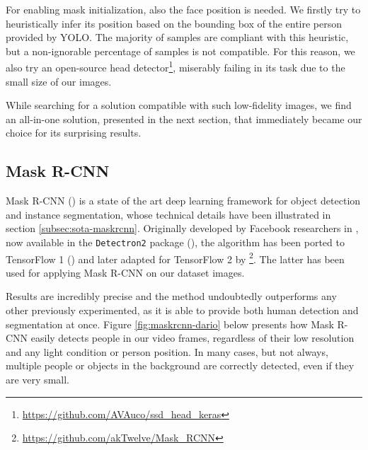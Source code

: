 \medskip

For enabling mask initialization, also the face position is needed. We firstly try to heuristically infer its position based on the bounding box of the entire person provided by YOLO. The majority of samples are compliant with this heuristic, but a non-ignorable percentage of samples is not compatible. For this reason, we also try an open-source head detector\footnote{\url{https://github.com/AVAuco/ssd_head_keras}}, miserably failing in its task due to the small size of our images.

\bigskip

While searching for a solution compatible with such low-fidelity images, we find an all-in-one solution, presented in the next section, that immediately became our choice for its surprising results.



\clearpage
\subsection{Mask R-CNN}
\label{subsec:masking-maskrcnn}

Mask R-CNN (\cite{he2018mask}) is a state of the art deep learning framework for object detection and instance segmentation, whose technical details have been illustrated in section \ref{subsec:sota-maskrcnn}. Originally developed by Facebook researchers in \cite{pytorch}, now available in the \texttt{Detectron2} package (\cite{wu2019detectron2}), the algorithm has been ported to TensorFlow 1 (\cite{MaskRCNN_matterport}) and later adapted for TensorFlow 2 by \cite{MaskRCNN_akTwelve}\footnote{\url{https://github.com/akTwelve/Mask_RCNN}}. The latter has been used for applying Mask R-CNN on our dataset images.

\medskip

Results are incredibly precise and the method undoubtedly outperforms any other previously experimented, as it is able to provide both human detection and segmentation at once. Figure \ref{fig:maskrcnn-dario} below presents how Mask R-CNN easily detects people in our video frames, regardless of their low resolution and any light condition or person position. In many cases, but not always, multiple people or objects in the background are correctly detected, even if they are very small.

